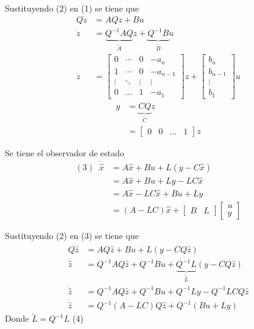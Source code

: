 Sustituyendo (2) en (1) se tiene que
\[
    \begin{split}
        Q\dot{z} & = AQz + Bu \\
        \dot{z} & = \underbrace{ Q^{-1}AQ }_{ \tilde{A} }z + \underbrace{ Q^{-1}B }_{ \tilde{B} }u \\
        \dot{z} & = 
            \begin{bmatrix}
                0 & \cdots & 0 & -a_{n} \\
                1 & \cdots & 0 & -a_{n-1} \\
                \vdots & \ddots & \vdots & \vdots \\
                0 & \ldots & 1 & -a_{1}
            \end{bmatrix} z +
            \begin{bmatrix}
                b_{n} \\ b_{n-1} \\ \vdots \\ b_{1}
            \end{bmatrix} u
    \end{split}
\]
\[
    \begin{split}
        y & = \underbrace{ CQ }_{ \tilde{C} }z \\
        & = \begin{bmatrix}
                0 & 0 & \ldots & 1
            \end{bmatrix} z
    \end{split}
\]

Se tiene el observador de estado
\[
    \begin{split}
        (3) \;\; \dot{\hat{x}} & = A\hat{x} + Bu + L(y-C\hat{x}) \\
        & = A\hat{x} + Bu + Ly - LC\hat{x} \\
        & = A\hat{x} - LC\hat{x} +Bu + Ly \\
        & = (A-LC)\hat{x} + \begin{bmatrix}B & L \end{bmatrix}\begin{bmatrix}   u \\ y \end{bmatrix}
    \end{split}
\]

Sustituyendo (2) en (3) se tiene que
\[
    \begin{split}
        Q\dot{\hat{z}} & = AQ\hat{z} + Bu + L(y-CQ\hat{z}) \\
        \dot{\hat{z}} & = Q^{-1}AQ\hat{z} + Q^{-1}Bu + \underbrace{Q^{-1}L}_{\tilde{L}}(y-CQ\hat{z}) \\
        \dot{\hat{z}} & = Q^{-1}AQ\hat{z} + Q^{-1}Bu + Q^{-1}Ly - Q^{-1}LCQ\hat{z} \\
        \dot{\hat{z}} & = Q^{-1}(A-LC)Q\hat{z} + Q^{-1}(Bu+Ly)
    \end{split}
\]
Donde \( \tilde{L} = Q^{-1}L \) (4)

